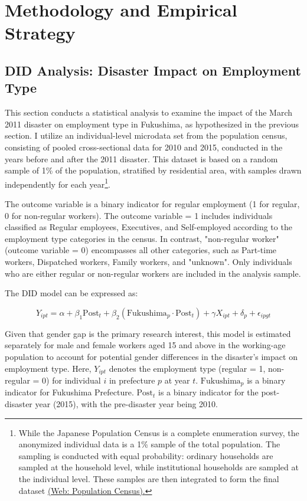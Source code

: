 \documentclass[a4paper,12pt]{article}
\begin{document}
\section{Methodology and Empirical Strategy}

\subsection{DID Analysis: Disaster Impact on Employment Type}
This section conducts a statistical analysis to examine the impact of the March 2011 disaster on employment type in Fukushima, as hypothesized in the previous section. I utilize an individual-level microdata set from the population census, consisting of pooled cross-sectional data for 2010 and 2015, conducted in the years before and after the 2011 disaster. This dataset is based on a random sample of 1\% of the population, stratified by residential area, with samples drawn independently for each year\footnote{While the Japanese Population Census is a complete enumeration survey, the anonymized individual data is a 1\% sample of the total population. The sampling is conducted with equal probability: ordinary households are sampled at the household level, while institutional households are sampled at the individual level. These samples are then integrated to form the final dataset \href{https://www.stat.go.jp/english/data/kokusei/index.html}{(Web: Population Census).}}.

The outcome variable is a binary indicator for regular employment (1 for regular, 0 for non-regular workers). The outcome variable = 1 includes individuals classified as Regular employees, Executives, and Self-employed according to the employment type categories in the census. In contrast, "non-regular worker" (outcome variable = 0) encompasses all other categories, such as Part-time workers, Dispatched workers, Family workers, and "unknown". Only individuals who are either regular or non-regular workers are included in the analysis sample.

The DID model can be expressed as:

\begin{equation}
Y_{ipt} = \alpha + \beta_1 \text{Post}_t + \beta_2 (\text{Fukushima}_p \cdot \text{Post}_t) + \gamma X_{ipt} + \delta_p + \epsilon_{ipgt}
\end{equation}

Given that gender gap is the primary research interest, this model is estimated separately for male and female workers aged 15 and above in the working-age population to account for potential gender differences in the disaster's impact on employment type. Here, $Y_{ipt}$ denotes the employment type (regular = 1, non-regular = 0) for individual $i$ in prefecture $p$ at year $t$. $\text{Fukushima}_p$ is a binary indicator for Fukushima Prefecture. $\text{Post}_t$ is a binary indicator for the post-disaster year (2015), with the pre-disaster year being 2010.
\end{document}
